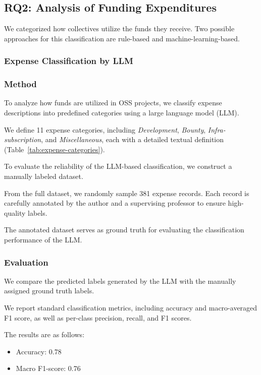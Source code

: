 \documentclass[11pt]{ist-thesis-lt}
\begin{document}
\subsection{RQ2: Analysis of Funding Expenditures}
We categorized how collectives utilize the funds they receive. 
Two possible approaches for this classification are rule-based and machine-learning-based. 

\subsubsection{Expense Classification by LLM}

\subsubsection{Method}

To analyze how funds are utilized in OSS projects, we classify expense descriptions into predefined categories using a large language model (LLM).

We define 11 expense categories, including \textit{Development}, \textit{Bounty}, \textit{Infra-subscription}, and \textit{Miscellaneous}, each with a detailed textual definition (Table~\ref{tab:expense-categories}).

To evaluate the reliability of the LLM-based classification, we construct a manually labeled dataset.

From the full dataset, we randomly sample 381 expense records. Each record is carefully annotated by the author and a supervising professor to ensure high-quality labels.

The annotated dataset serves as ground truth for evaluating the classification performance of the LLM.

\subsubsection{Evaluation}

We compare the predicted labels generated by the LLM with the manually assigned ground truth labels.

We report standard classification metrics, including accuracy and macro-averaged F1 score, as well as per-class precision, recall, and F1 scores.

The results are as follows:

\begin{itemize}
    \item Accuracy: 0.78
    \item Macro F1-score: 0.76
\end{itemize}
\end{document}
